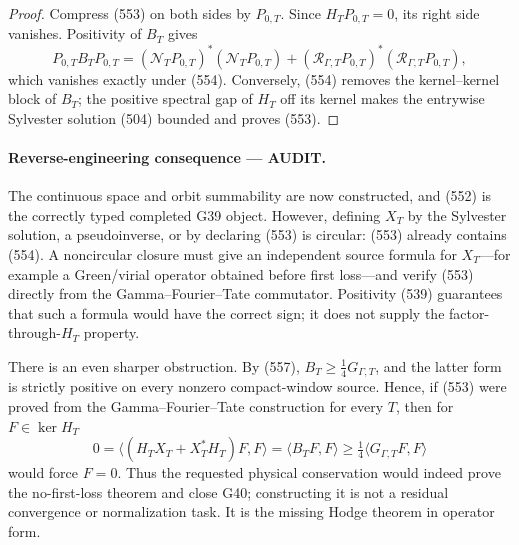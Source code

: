 \documentclass[11pt]{article}
\newcommand{\AUDIT}{\textcolor{orange!75!black}{\textbf{AUDIT}}}
\begin{document}
\begin{proof}
Compress (553) on both sides by \(P_{0,T}\).  Since
\(H_TP_{0,T}=0\), its right side vanishes.  Positivity of \(B_T\) gives
\[
 P_{0,T}B_TP_{0,T}
 =(\mathcal N_TP_{0,T})^*(\mathcal N_TP_{0,T})
  +(\mathcal R_{\Gamma,T}P_{0,T})^*
    (\mathcal R_{\Gamma,T}P_{0,T}),
\]
which vanishes exactly under (554).  Conversely, (554) removes the
kernel--kernel block of \(B_T\); the positive spectral gap of \(H_T\) off
its kernel makes the entrywise Sylvester solution (504) bounded and proves
(553).
\end{proof}

\paragraph{Reverse-engineering consequence --- \AUDIT.}
The continuous space and orbit summability are now constructed, and (552)
is the correctly typed completed G39 object.  However, defining \(X_T\) by
the Sylvester solution, a pseudoinverse, or by declaring (553) is circular:
(553) already contains (554).  A noncircular closure must give an
independent source formula for \(X_T\)---for example a Green/virial
operator obtained before first loss---and verify (553) directly from the
Gamma--Fourier--Tate commutator.  Positivity (539) guarantees that such a
formula would have the correct sign; it does not supply the
factor-through-\(H_T\) property.

There is an even sharper obstruction.  By (557),
\(B_T\ge\frac14G_{\Gamma,T}\), and the latter form is strictly positive on
every nonzero compact-window source.  Hence, if (553) were proved from the
Gamma--Fourier--Tate construction for every \(T\), then for
\(F\in\ker H_T\)
\[
 0=\langle(H_TX_T+X_T^*H_T)F,F\rangle
  =\langle B_TF,F\rangle
 \ge\tfrac14\langle G_{\Gamma,T}F,F\rangle
\]
would force \(F=0\).  Thus the requested physical conservation would
indeed prove the no-first-loss theorem and close G40; constructing it is
not a residual convergence or normalization task.  It is the missing
Hodge theorem in operator form.
\end{document}
